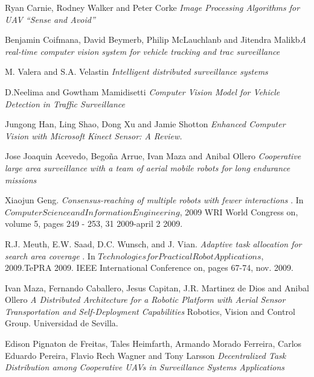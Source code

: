 \documentclass[11pt, oneside]{book} %
\begin{document}
\listoffigures{}

\begin{thebibliography}{9}

 Ryan Carnie, Rodney Walker and Peter Corke \textit{Image Processing Algorithms for UAV “Sense and Avoid”} 

 Benjamin Coifmana, David Beymerb, Philip McLauchlanb and Jitendra Malikb\textit{A real-time computer vision system for vehicle tracking and trac surveillance} 

 M. Valera and S.A. Velastin \textit{Intelligent distributed surveillance systems} 

 D.Neelima and Gowtham Mamidisetti \textit{Computer Vision Model for Vehicle Detection in Traffic Surveillance} 

 Jungong Han, Ling Shao, Dong Xu and Jamie Shotton \textit{Enhanced Computer Vision with Microsoft Kinect Sensor: A Review.} 

 Jose Joaquin Acevedo, Bego\~na Arrue, Ivan Maza and Anibal Ollero \textit{Cooperative large area surveillance with a team of aerial mobile robots for long endurance missions}


 Xiaojun Geng. \textit{ Consensus-reaching of multiple robots with fewer interactions }. In $Computer Science and Information Engineering$, 2009 WRI World Congress on, volume 5, pages 249 - 253, 31 2009-april 2 2009.

 R.J. Meuth, E.W. Saad, D.C. Wunsch, and J. Vian. \textit{Adaptive task allocation for search area coverage} . In $Technologies for Practical Robot Applications$, 2009.TePRA 2009. IEEE International Conference on, pages 67-74, nov. 2009.

 Ivan Maza, Fernando Caballero, Jesus Capitan, J.R. Martinez de Dios and Anibal Ollero \textit{A Distributed Architecture for a Robotic Platform with Aerial Sensor Transportation and Self-Deployment Capabilities} Robotics, Vision and Control Group. Universidad de Sevilla.

 Edison Pignaton de Freitas, Tales Heimfarth, Armando Morado Ferreira, Carlos Eduardo Pereira, Flavio Rech Wagner and Tony Larsson \textit{Decentralized Task Distribution among Cooperative UAVs in Surveillance Systems Applications}


\end{thebibliography}
\end{document}
